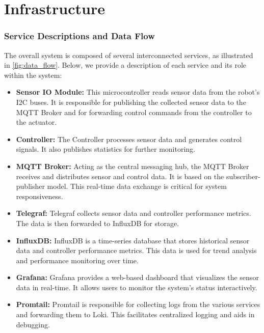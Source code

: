 

\chapter{Infrastructure}

\subsection{Service Descriptions and Data Flow}

The overall system is composed of several interconnected services, as illustrated in \cref{fig:data_flow}.
Below, we provide a description of each service and its role within the system:

\begin{itemize}
    \item \textbf{Sensor IO Module:}
    This microcontroller reads sensor data from the robot's I2C buses.
    It is responsible for publishing the collected sensor data to the MQTT Broker and for forwarding control commands from the controller to the actuator.

    \item \textbf{Controller:}
    The Controller processes sensor data and generates control signals.
    It also publishes statistics for further monitoring.

    \item \textbf{MQTT Broker:}
    Acting as the central messaging hub, the MQTT Broker receives and distributes sensor and control data.
    It is based on the subscriber-publisher model.
    This real-time data exchange is critical for system responsiveness.

    \item \textbf{Telegraf:}
    Telegraf collects sensor data and controller performance metrics.
    The data is then forwarded to InfluxDB for storage.

    \item \textbf{InfluxDB:}
    InfluxDB is a time-series database that stores historical sensor data and controller performance metrics.
    This data is used for trend analysis and performance monitoring over time.

    \item \textbf{Grafana:}
    Grafana provides a web-based dashboard that visualizes the sensor data in real-time.
    It allows users to monitor the system's status interactively.

    \item \textbf{Promtail:}
    Promtail is responsible for collecting logs from the various services and forwarding them to Loki.
    This facilitates centralized logging and aids in debugging.


\end{itemize}
